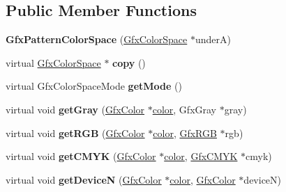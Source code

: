 \subsection*{Public Member Functions}
\begin{DoxyCompactItemize}
\item 
\mbox{\label{class_gfx_pattern_color_space_a2b06302c4aebb10b7637b6b37b17b379}} 
{\bfseries Gfx\+Pattern\+Color\+Space} (\hyperlink{class_gfx_color_space}{Gfx\+Color\+Space} $\ast$underA)
\item 
\mbox{\label{class_gfx_pattern_color_space_a817b809c749ad1d1b2ae27838aea1dc5}} 
virtual \hyperlink{class_gfx_color_space}{Gfx\+Color\+Space} $\ast$ {\bfseries copy} ()
\item 
\mbox{\label{class_gfx_pattern_color_space_a4070f8f0a751013b79d3cc118598656f}} 
virtual Gfx\+Color\+Space\+Mode {\bfseries get\+Mode} ()
\item 
\mbox{\label{class_gfx_pattern_color_space_a8e9a858f9f5bb41842d201836fa48192}} 
virtual void {\bfseries get\+Gray} (\hyperlink{struct_gfx_color}{Gfx\+Color} $\ast$\hyperlink{structcolor}{color}, Gfx\+Gray $\ast$gray)
\item 
\mbox{\label{class_gfx_pattern_color_space_a1d3c46ea07421e298d5a33d69a67cb0d}} 
virtual void {\bfseries get\+R\+GB} (\hyperlink{struct_gfx_color}{Gfx\+Color} $\ast$\hyperlink{structcolor}{color}, \hyperlink{struct_gfx_r_g_b}{Gfx\+R\+GB} $\ast$rgb)
\item 
\mbox{\label{class_gfx_pattern_color_space_a01978a4a92d36514096010cbd08b2bc9}} 
virtual void {\bfseries get\+C\+M\+YK} (\hyperlink{struct_gfx_color}{Gfx\+Color} $\ast$\hyperlink{structcolor}{color}, \hyperlink{struct_gfx_c_m_y_k}{Gfx\+C\+M\+YK} $\ast$cmyk)
\item 
\mbox{\label{class_gfx_pattern_color_space_a0174bdddfae4cd21a5b05fa271f52ea6}} 
virtual void {\bfseries get\+DeviceN} (\hyperlink{struct_gfx_color}{Gfx\+Color} $\ast$\hyperlink{structcolor}{color}, \hyperlink{struct_gfx_color}{Gfx\+Color} $\ast$deviceN)

\end{DoxyCompactItemize}
